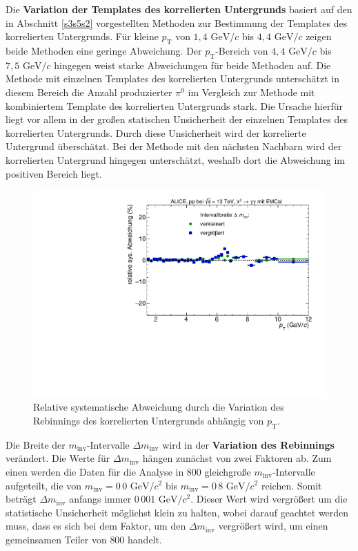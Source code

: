 \newline
Die \textbf{Variation der Templates des korrelierten Untergrunds} basiert auf den in Abschnitt \ref{s3s5s2} vorgestellten Methoden zur Bestimmung der Templates des korrelierten Untergrunds.
Für kleine $p_\text{T}$ von $1,4 \text{ GeV}/c$ bis $4,4 \text{ GeV}/c$ zeigen beide Methoden eine geringe Abweichung.
Der $p_\text{T}$-Bereich von $4,4 \text{ GeV}/c$ bis $7,5 \text{ GeV}/c$ hingegen weist starke Abweichungen für beide Methoden auf.
Die Methode mit einzelnen Templates des korrelierten Untergrunds unterschätzt in diesem Bereich die Anzahl produzierter $\pi^{0}$ im Vergleich zur Methode mit kombiniertem Template des korrelierten Untergrunds stark.
Die Ursache hierfür liegt vor allem in der großen statischen Unsicherheit der einzelnen Templates des korrelierten Untergrunds.
Durch diese Unsicherheit wird der korrelierte Untergrund überschätzt.
Bei der Methode mit den nächsten Nachbarn wird der korrelierten Untergrund hingegen unterschätzt, weshalb dort die Abweichung im positiven Bereich liegt.
\begin{figure}[t!]
\centering
\includegraphics[width=.65\linewidth]{YieldsSysUncerRebinning_Data_2016.pdf}
\caption{Relative systematische Abweichung durch die Variation des Rebinnings des korrelierten Untergrunds abhängig von $p_\text{T}$.}
\label{fig:BinningSys}
\end{figure}
\newline
Die Breite der $m_\text{inv}$-Intervalle $\Delta m_\text{inv}$ wird in der \textbf{Variation des Rebinnings} verändert.
Die Werte für $\Delta m_\text{inv}$ hängen zunächst von zwei Faktoren ab.
Zum einen werden die Daten für die Analyse in $800$ gleichgroße $m_\text{inv}$-Intervalle aufgeteilt, die von $m_\text{inv} = 0\,0 \text{ GeV}/c^{2}$ bis $m_\text{inv} = 0\,8 \text{ GeV}/c^{2}$ reichen.
Somit beträgt $\Delta m_\text{inv}$ anfangs immer $0\,001 \text{ GeV}/c^{2}$.
Dieser Wert wird vergrößert um die statistische Unsicherheit möglichst klein zu halten, wobei darauf geachtet werden muss, dass es sich bei dem Faktor, um den $\Delta m_\text{inv}$ vergrößert wird, um einen gemeinsamen Teiler von $800$ handelt.
